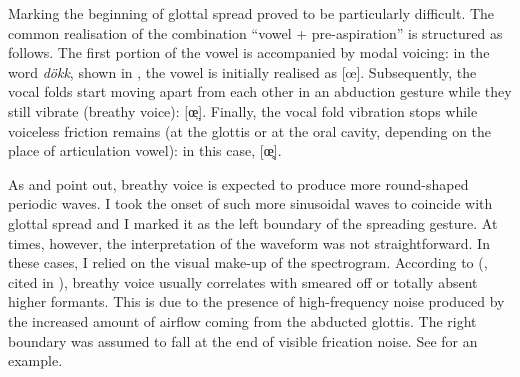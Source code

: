 \documentclass[11pt,a4paper,oneside,openany]{memoir}\usepackage[]{graphicx}\usepackage[]{color}
\begin{document}
Marking the beginning of glottal spread proved to be particularly difficult.
The common realisation of the combination ``vowel + pre-aspiration'' is structured as follows.
The first portion of the vowel is accompanied by modal voicing: in the word \textit{dökk}, shown in , the vowel is initially realised as [œ].
Subsequently, the vocal folds start moving apart from each other in an abduction gesture while they still vibrate (breathy voice): [œ̤].
Finally, the vocal fold vibration stops while voiceless friction remains (at the glottis or at the oral cavity, depending on the place of articulation vowel): in this case, [œ̥].

As \citet{khan2012} and \citet{nance2013} point out, breathy voice is expected to produce more round-shaped periodic waves.
I took the onset of such more sinusoidal waves to coincide with glottal spread and I marked it as the left boundary of the spreading gesture.
At times, however, the interpretation of the waveform was not straightforward.
In these cases, I relied on the visual make-up of the spectrogram.
According to \citeauthor{jones2006} (\citeyear{jones2006}, cited in \citealt[p. 134]{nance2013}), breathy voice usually correlates with smeared off or totally absent higher formants.
This is due to the presence of high-frequency noise produced by the increased amount of airflow coming from the abducted glottis.
The right boundary was assumed to fall at the end of visible frication noise.
See  for an example.
\end{document}

